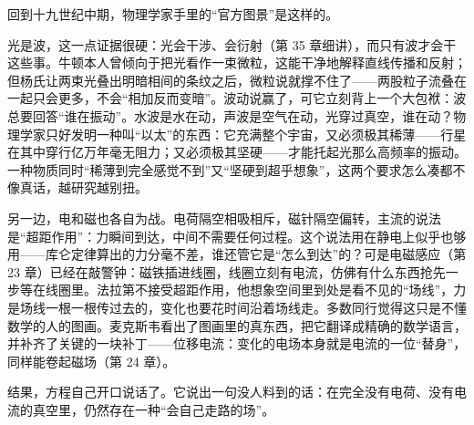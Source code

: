 \begin{mainline}
回到十九世纪中期，物理学家手里的“官方图景”是这样的。

光是波，这一点证据很硬：光会干涉、会衍射（第 35 章细讲），而只有波才会干这些事。牛顿本人曾倾向于把光看作一束微粒，这能干净地解释直线传播和反射；但杨氏让两束光叠出明暗相间的条纹之后，微粒说就撑不住了——两股粒子流叠在一起只会更多，不会“相加反而变暗”。波动说赢了，可它立刻背上一个大包袱：波总要回答“谁在振动”。水波是水在动，声波是空气在动，光穿过真空，谁在动？物理学家只好发明一种叫“以太”的东西：它充满整个宇宙，又必须极其稀薄——行星在其中穿行亿万年毫无阻力；又必须极其坚硬——才能托起光那么高频率的振动。一种物质同时“稀薄到完全感觉不到”又“坚硬到超乎想象”，这两个要求怎么凑都不像真话，越研究越别扭。

另一边，电和磁也各自为战。电荷隔空相吸相斥，磁针隔空偏转，主流的说法是“超距作用”：力瞬间到达，中间不需要任何过程。这个说法用在静电上似乎也够用——库仑定律算出的力分毫不差，谁还管它是“怎么到达”的？可是电磁感应（第 23 章）已经在敲警钟：磁铁插进线圈，线圈立刻有电流，仿佛有什么东西抢先一步等在线圈里。法拉第不接受超距作用，他想象空间里到处是看不见的“场线”，力是场线一根一根传过去的，变化也要花时间沿着场线走。多数同行觉得这只是不懂数学的人的图画。麦克斯韦看出了图画里的真东西，把它翻译成精确的数学语言，并补齐了关键的一块补丁——位移电流：变化的电场本身就是电流的一位“替身”，同样能卷起磁场（第 24 章）。

结果，方程自己开口说话了。它说出一句没人料到的话：在完全没有电荷、没有电流的真空里，仍然存在一种“会自己走路的场”。
\end{mainline}


